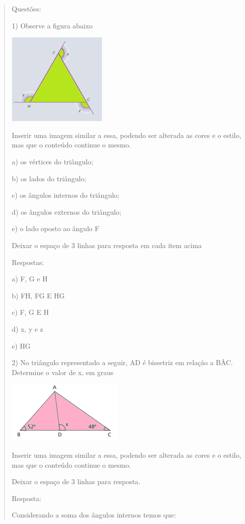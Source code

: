 \begin{quote}
\begin{escolha}
Questões:

1) Observe a figura abaixo

\includegraphics[width=1.88333in,height=1.75048in]{./imgSAEB_8_MAT/media/image13.png}

Inserir uma imagem similar a essa, podendo ser alterada as cores e o
estilo, mas que o conteúdo continue o mesmo.

a) os vértices do triângulo;

b) os lados do triângulo;

c) os ângulos internos do triângulo;

d) os ângulos externos do triângulo;

e) o lado oposto ao ângulo F

Deixar o espaço de 3 linhas para resposta em cada item acima

Respostas:

a) F, G e H

b) FH, FG E HG

c) F, G E H

d) x, y e z

e) HG

2) No triângulo representado a seguir, AD é bissetriz em relação a BÂC.
Determine o valor de x, em graus

\includegraphics[width=2.20833in,height=1.1875in]{./imgSAEB_8_MAT/media/image14.png}

Inserir uma imagem similar a essa, podendo ser alterada as cores e o
estilo, mas que o conteúdo continue o mesmo.

Deixar o espaço de 3 linhas para resposta.

Resposta:

Considerando a soma dos ângulos internos temos que:


\end{escolha}
\end{quote}
